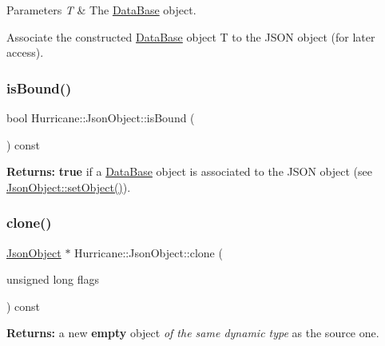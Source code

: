\begin{DoxyParams}{Parameters}
{\em T} & The \hyperlink{classHurricane_1_1DataBase}{Data\+Base} object.\\
\hline
\end{DoxyParams}
Associate the constructed \hyperlink{classHurricane_1_1DataBase}{Data\+Base} object {\ttfamily T} to the J\+S\+ON object (for later access). \mbox{\label{classHurricane_1_1JsonObject_a4bb80844dcd175ad16cf92ee29064850}} 
\subsubsection{\texorpdfstring{is\+Bound()}{isBound()}}
{\footnotesize\ttfamily bool Hurricane\+::\+Json\+Object\+::is\+Bound (\begin{DoxyParamCaption}{ }\end{DoxyParamCaption}) const\hspace{0.3cm}{\ttfamily [inline]}}

{\bfseries Returns\+:} {\bfseries true} if a \hyperlink{classHurricane_1_1DataBase}{Data\+Base} object is associated to the J\+S\+ON object (see \hyperlink{classHurricane_1_1JsonObject_aa8e23d2445b90cced19a97d50372314c}{Json\+Object\+::set\+Object()}). \mbox{\label{classHurricane_1_1JsonObject_a939cfbae43f7b0d994648d07bdba2b32}} 
\subsubsection{\texorpdfstring{clone()}{clone()}}
{\footnotesize\ttfamily \hyperlink{classHurricane_1_1JsonObject}{Json\+Object} $\ast$ Hurricane\+::\+Json\+Object\+::clone (\begin{DoxyParamCaption}\item[{unsigned long}]{flags }\end{DoxyParamCaption}) const\hspace{0.3cm}{\ttfamily [pure virtual]}}

{\bfseries Returns\+:} a new {\bfseries empty} object {\itshape of the same dynamic type} as the source one.


